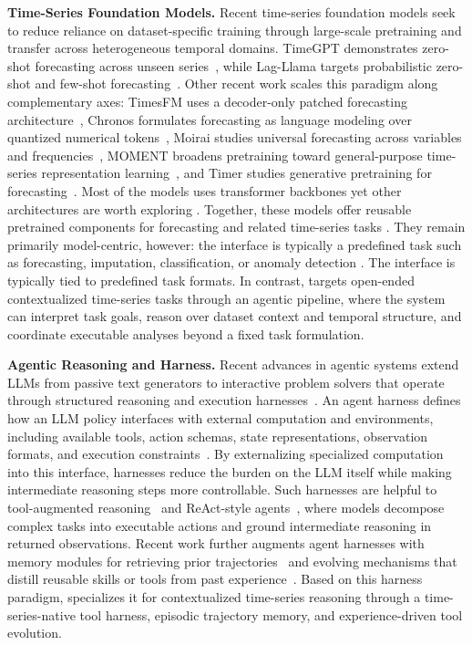 \textbf{Time-Series Foundation Models.} 
Recent time-series foundation models seek to reduce reliance on dataset-specific training through large-scale pretraining and transfer across heterogeneous temporal domains. TimeGPT demonstrates zero-shot forecasting across unseen series~\citep{garza2023timegpt}, while Lag-Llama targets probabilistic zero-shot and few-shot forecasting~\citep{rasul2023lagllama}. Other recent work scales this paradigm along complementary axes: TimesFM uses a decoder-only patched forecasting architecture~\citep{das2023decoder}, Chronos formulates forecasting as language modeling over quantized numerical tokens~\citep{ansari2024chronos}, Moirai studies universal forecasting across variables and frequencies~\citep{woo2024unified}, MOMENT broadens pretraining toward general-purpose time-series representation learning~\citep{goswami2024moment}, and Timer studies generative pretraining for forecasting~\citep{liu2024timer}. Most of the models uses transformer backbones yet other architectures are worth exploring \citep{ai2025resmoe, ai2025nirvana, zou2026transformer, tieu2025learnable}. Together, these models offer reusable pretrained components for forecasting and related time-series tasks \citep{VQKDD,guo2024}. They remain primarily model-centric, however: the interface is typically a predefined task such as forecasting, imputation, classification, or anomaly detection \citep{zhou2023one,gcformer,svq}. The interface is typically tied to predefined task formats. In contrast, \method targets open-ended contextualized time-series tasks through an agentic pipeline, where the system can interpret task goals, reason over dataset context and temporal structure, and coordinate executable analyses beyond a fixed task formulation.









\textbf{Agentic Reasoning and Harness.}
Recent advances in agentic systems extend LLMs from passive text generators to interactive problem solvers that operate through structured reasoning and execution harnesses~\cite{li2025survey,ning2026mc}. An agent harness defines how an LLM policy interfaces with external computation and environments, including available tools, action schemas, state representations, observation formats, and execution constraints~\cite{zhou2026externalization}. By externalizing specialized computation into this interface, harnesses reduce the burden on the LLM itself while making intermediate reasoning steps more controllable. Such harnesses are helpful to tool-augmented reasoning~\cite{ma2024sciagent} and ReAct-style agents~\cite{DBLP:conf/iclr/YaoZYDSN023}, where models decompose complex tasks into executable actions and ground intermediate reasoning in returned observations. Recent work further augments agent harnesses with memory modules for retrieving prior trajectories~\cite{hu2025memory,huang2026rethinking} and evolving mechanisms that distill reusable skills or tools from past experience~\cite{wei2025evo,fang2025comprehensive}. Based on this harness paradigm, \method specializes it for contextualized time-series reasoning through a time-series-native tool harness, episodic trajectory memory, and experience-driven tool evolution.


